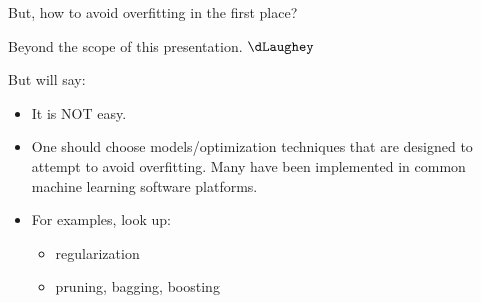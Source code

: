 

\begin{frame}{\Large But, how to avoid overfitting in the first place?}

\footnotesize

\pause
\begin{center}
\vskip 1.0cm
{\Large Beyond the scope of this presentation. $\dLaughey$}
\end{center}

\pause
\vskip 0.6cm
But will say:
\begin{itemize}
\item
	\pause It is NOT easy.

\vskip 0.1cm
\item
	\pause One should choose models/optimization techniques that are designed to attempt to avoid overfitting.
	\pause Many have been implemented in common machine learning software platforms.

\vskip 0.1cm
\pause
\item
	For examples, look up:
	\begin{itemize}
	\item
		\vskip -0.1cm
		{\footnotesize regularization}
	\item
		{\footnotesize pruning, bagging, boosting}
	\end{itemize}

\end{itemize}

\end{frame}
\normalsize

